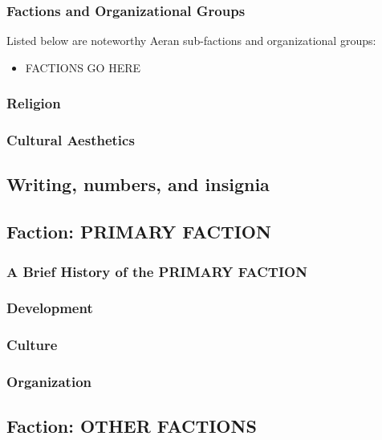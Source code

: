 \subsubsection{Factions and Organizational Groups}
Listed below are noteworthy Aeran sub-factions and organizational groups: 
\begin{itemize}
\item FACTIONS GO HERE
\end{itemize}

\subsubsection{Religion}

\subsubsection{Cultural Aesthetics}

\subsection{Writing, numbers, and insignia}

\subsection{Faction: PRIMARY FACTION}


\subsubsection{A Brief History of the PRIMARY FACTION}


\subsubsection{Development}

\subsubsection{Culture}

\subsubsection{Organization}

\subsection{Faction: OTHER FACTIONS}

